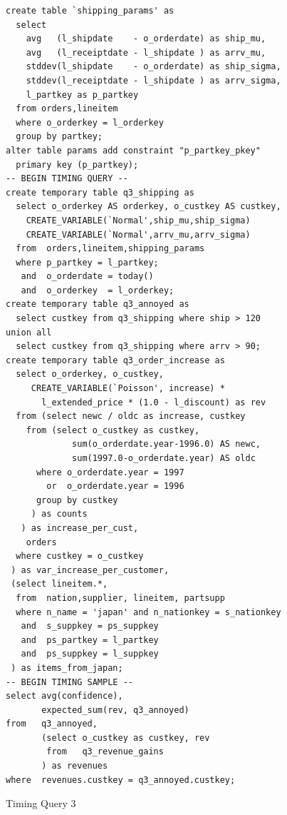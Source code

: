 \begin{figure}[t!]
\begin{footnotesize}
\begin{verbatim}
create table `shipping_params' as
  select 
    avg   (l_shipdate    - o_orderdate) as ship_mu,
    avg   (l_receiptdate - l_shipdate ) as arrv_mu,
    stddev(l_shipdate    - o_orderdate) as ship_sigma,
    stddev(l_receiptdate - l_shipdate ) as arrv_sigma,
    l_partkey as p_partkey
  from orders,lineitem
  where o_orderkey = l_orderkey
  group by partkey;
alter table params add constraint "p_partkey_pkey" 
  primary key (p_partkey);
-- BEGIN TIMING QUERY --
create temporary table q3_shipping as
  select o_orderkey AS orderkey, o_custkey AS custkey,
    CREATE_VARIABLE(`Normal',ship_mu,ship_sigma)
    CREATE_VARIABLE(`Normal',arrv_mu,arrv_sigma)
  from  orders,lineitem,shipping_params
  where p_partkey = l_partkey;
   and  o_orderdate = today()
   and  o_orderkey  = l_orderkey;
create temporary table q3_annoyed as
  select custkey from q3_shipping where ship > 120
union all
  select custkey from q3_shipping where arrv > 90;
create temporary table q3_order_increase as
  select o_orderkey, o_custkey,
     CREATE_VARIABLE(`Poisson', increase) *
       l_extended_price * (1.0 - l_discount) as rev
  from (select newc / oldc as increase, custkey 
    from (select o_custkey as custkey, 
             sum(o_orderdate.year-1996.0) AS newc,
             sum(1997.0-o_orderdate.year) AS oldc
      where o_orderdate.year = 1997 
        or  o_orderdate.year = 1996
      group by custkey
     ) as counts
   ) as increase_per_cust,
    orders
  where custkey = o_custkey
 ) as var_increase_per_customer,
 (select lineitem.*,
  from  nation,supplier, lineitem, partsupp
  where n_name = 'japan' and n_nationkey = s_nationkey
   and  s_suppkey = ps_suppkey
   and  ps_partkey = l_partkey
   and  ps_suppkey = l_suppkey
 ) as items_from_japan;
-- BEGIN TIMING SAMPLE --
select avg(confidence),
       expected_sum(rev, q3_annoyed)
from   q3_annoyed,
       (select o_custkey as custkey, rev
        from   q3_revenue_gains
       ) as revenues
where  revenues.custkey = q3_annoyed.custkey;
\end{verbatim}
\end{footnotesize}

\vspace{-5mm}

\caption{Timing Query 3}
\label{fig:timingq3}
\end{figure}